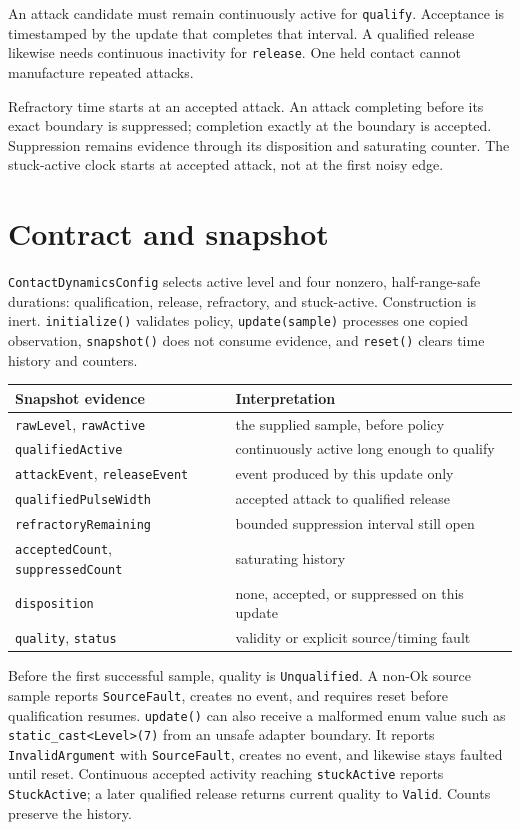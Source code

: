 \documentclass[11pt]{article}
\begin{document}
An attack candidate must remain continuously active for \texttt{qualify}.
Acceptance is timestamped by the update that completes that interval. A
qualified release likewise needs continuous inactivity for \texttt{release}.
One held contact cannot manufacture repeated attacks.

Refractory time starts at an accepted attack. An attack completing before its
exact boundary is suppressed; completion exactly at the boundary is accepted.
Suppression remains evidence through its disposition and saturating counter.
The stuck-active clock starts at accepted attack, not at the first noisy edge.

\section{Contract and snapshot}
\texttt{ContactDynamicsConfig} selects active level and four nonzero,
half-range-safe durations: qualification, release, refractory, and
stuck-active. Construction is inert. \texttt{initialize()} validates policy,
\texttt{update(sample)} processes one copied observation, \texttt{snapshot()}
does not consume evidence, and \texttt{reset()} clears time history and
counters.

\begin{tabularx}{\linewidth}{@{}l X@{}}
\toprule
Snapshot evidence & Interpretation\\
\midrule
\texttt{rawLevel}, \texttt{rawActive} & the supplied sample, before policy\\
\texttt{qualifiedActive} & continuously active long enough to qualify\\
\texttt{attackEvent}, \texttt{releaseEvent} & event produced by this update only\\
\texttt{qualifiedPulseWidth} & accepted attack to qualified release\\
\texttt{refractoryRemaining} & bounded suppression interval still open\\
\texttt{acceptedCount}, \texttt{suppressedCount} & saturating history\\
\texttt{disposition} & none, accepted, or suppressed on this update\\
\texttt{quality}, \texttt{status} & validity or explicit source/timing fault\\
\bottomrule
\end{tabularx}

Before the first successful sample, quality is
\texttt{Unqualified}. A non-Ok source sample reports
\texttt{SourceFault}, creates no event, and requires reset before
qualification resumes. \texttt{update()} can also receive a malformed enum
value such as
\texttt{static\_cast<Level>(7)} from an unsafe adapter boundary. It reports
\texttt{InvalidArgument} with \texttt{SourceFault}, creates no event, and
likewise stays faulted until reset. Continuous accepted activity reaching
\texttt{stuckActive} reports \texttt{StuckActive}; a later qualified release
returns current quality to \texttt{Valid}. Counts preserve the history.
\end{document}
